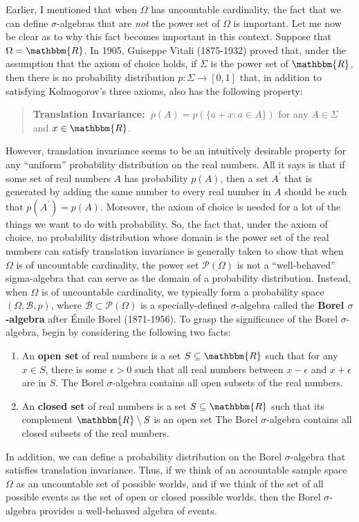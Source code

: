 \documentclass[11pt]{article}
\theoremstyle{definition}
\theoremstyle{remark}
\begin{document}
Earlier, I mentioned that when $\Omega$ has uncountable cardinality, the fact that we can define $\sigma$-algebras that are \textit{not} the power set of $\Omega$ is important. Let me now be clear as to why this fact becomes important in this context. Suppose that $\Omega=\mathbbm{R}$. In 1905, Guiseppe Vitali (1875-1932) proved that, under the assumption that the axiom of choice holds, if $\Sigma$ is the power set of $\mathbbm{R}$, then there is no probability distribution $p:\Sigma\rightarrow[0,1]$ that, in addition to satisfying Kolmogorov's three axioms, also has the following property:
\begin{quote}
\textbf{Translation Invariance:\ }$p(A) = p(\{a+x:a\in A\})$ for any $A\in\Sigma$ and $x\in\mathbbm{R}$.
\end{quote}
However, translation invariance seems to be an intuitively desirable property for any ``uniform'' probability distribution on the real numbers. All it says is that if some set of real numbers $A$ has probability $p(A)$, then a set $A^{\prime}$ that is generated by adding the same number to every real number in $A$ should be such that $p(A^{\prime})=p(A)$.  Moreover, the axiom of choice is needed for a lot of the things we want to do with probability. So, the fact that, under the axiom of choice, no probability distribution whose domain is the power set of the real numbers can satisfy translation invariance is generally taken to show that when $\Omega$ is of uncountable cardinality, the power set $\mathcal{P}(\Omega)$ is not a ``well-behaved'' sigma-algebra that can serve as the domain of a probability distribution. Instead, when $\Omega$ is of uncountable cardinality, we typically form a probability space $(\Omega,\mathcal{B},p)$, where $\mathcal{B}\subset\mathcal{P}(\Omega)$ is a specially-defined $\sigma$-algebra called the \textbf{Borel $\sigma$-algebra} after \'Emile Borel (1871-1956). To grasp the significance of the Borel $\sigma$-algebra, begin by considering the following two facts:\
\begin{enumerate}
    \item An \textbf{open set} of real numbers is a set $S\subseteq\mathbbm{R}$ such that for any $x\in S$, there is some $\epsilon>0$ such that all real numbers between $x-\epsilon$ and $x+\epsilon$ are in $S$. The Borel $\sigma$-algebra contains all open subsets of the real numbers.
    
    \item An \textbf{closed set} of real numbers is a set $S\subseteq\mathbbm{R}$ such that its complement $\mathbbm{R}\setminus S$ is an open set The Borel $\sigma$-algebra contains all closed subsets of the real numbers.
\end{enumerate}
In addition, we can define a probability distribution on the Borel $\sigma$-algebra that satisfies translation invariance. Thus, if we think of an accountable sample space $\Omega$ as an uncountable set of possible worlds, and if we think of the set of all possible events as the set of open or closed possible worlds, then the Borel $\sigma$-algebra provides a well-behaved algebra of events.\par 
\end{document}
